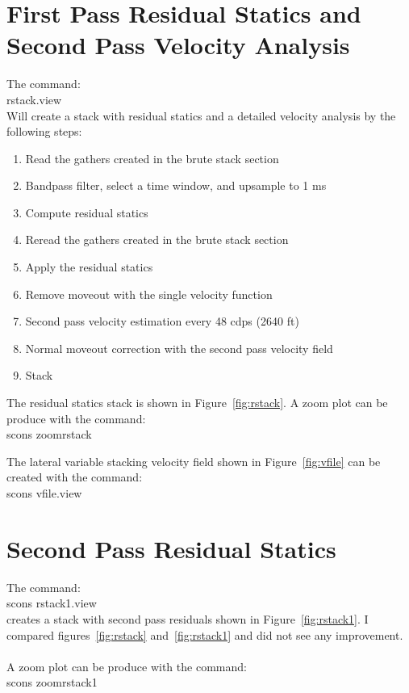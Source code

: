 \section{First Pass Residual Statics and Second Pass Velocity Analysis}
The command:\\
rstack.view\\
Will create a stack with residual statics and a detailed velocity analysis 
by the following steps:
\begin{enumerate}
\item Read the gathers created in the brute stack section
\item Bandpass filter, select a time window, and upsample to 1 ms
\item Compute residual statics
\item Reread the gathers created in the brute stack section
\item Apply the residual statics
\item Remove moveout with the single velocity function 
\item Second pass velocity estimation every 48 cdps (2640 ft)
\item Normal moveout correction with the second pass velocity field 
\item Stack
\end{enumerate}

The residual statics stack is shown in Figure~\ref{fig:rstack}.  A zoom 
plot can be produce with the command:\\
scons zoomrstack


The lateral variable stacking velocity field shown in Figure~\ref{fig:vfile} 
can be created with the command:\\
scons vfile.view


\section{Second Pass Residual Statics}
The command:\\
scons rstack1.view\\
creates a stack with second pass residuals shown in Figure~\ref{fig:rstack1}.  
I compared figures~\ref{fig:rstack} and~\ref{fig:rstack1} and did not see 
any improvement.\\
\\  
A zoom plot can be produce with the command:\\
scons zoomrstack1

